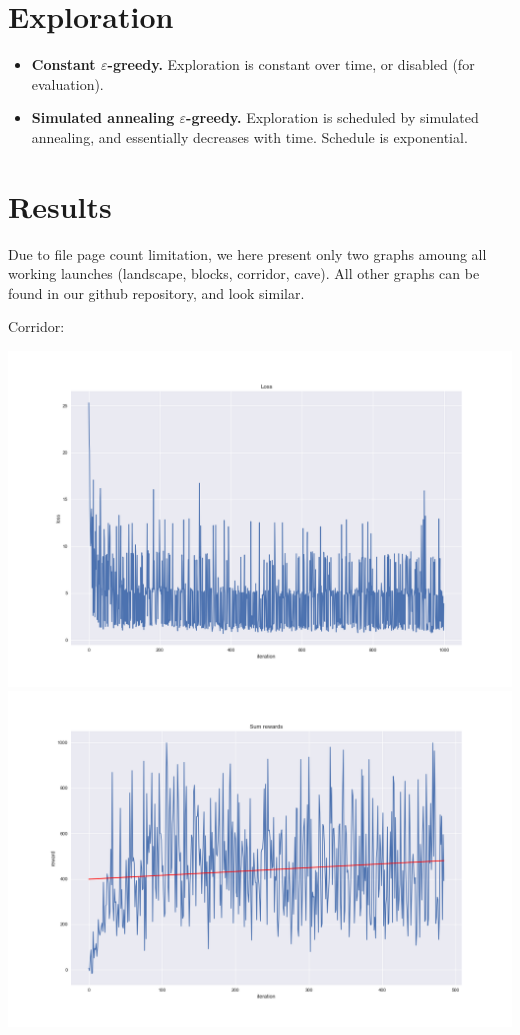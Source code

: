 \documentclass{article}
\begin{document}
\section{Exploration}

\begin{itemize}
    \item {\bf Constant $\varepsilon$-greedy.} Exploration is constant over time, or disabled (for evaluation).
    \item {\bf Simulated annealing $\varepsilon$-greedy.} Exploration is scheduled by simulated annealing, and essentially decreases with time.
        Schedule is exponential.
\end{itemize}

\section{Results}

Due to file page count limitation, we here present 
only two graphs amoung all working launches (landscape, blocks, corridor, cave).
All other graphs can be found in our github repository, and look similar.

Corridor:

\includegraphics[scale=0.2]{plots/corridor_loss.png}
\includegraphics[scale=0.2]{plots/corridor_rewards.png}
\end{document}
